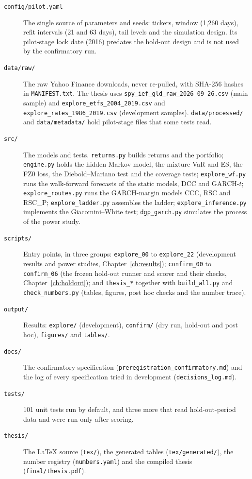 \begin{sloppypar}
\begin{description}
\item[\texttt{config/pilot.yaml}] The single source of parameters and seeds: tickers, window (1,260 days), refit intervals (21 and 63 days), tail levels and the simulation design. Its pilot-stage lock date (2016) predates the hold-out design and is not used by the confirmatory run.
\item[\texttt{data/raw/}] The raw Yahoo Finance downloads, never re-pulled, with SHA-256 hashes in \texttt{MANIFEST.txt}. The thesis uses \texttt{spy\_ief\_gld\_raw\_2026-09-26.csv} (main sample) and \texttt{explore\_etfs\_2004\_2019.csv} and \texttt{explore\_rates\_1986\_2019.csv} (development samples). \texttt{data/processed/} and \texttt{data/metadata/} hold pilot-stage files that some tests read.
\item[\texttt{src/}] The models and tests. \texttt{returns.py} builds returns and the portfolio; \texttt{engine.py} holds the hidden Markov model, the mixture VaR and ES, the FZ0 loss, the Diebold--Mariano test and the coverage tests; \texttt{explore\_wf.py} runs the walk-forward forecasts of the static models, DCC and GARCH-$t$; \texttt{explore\_routes.py} runs the GARCH-margin models CCC, RSC and RSC\_P; \texttt{explore\_ladder.py} assembles the ladder; \texttt{explore\_inference.py} implements the Giacomini--White test; \texttt{dgp\_garch.py} simulates the process of the power study.
\item[\texttt{scripts/}] Entry points, in three groups: \texttt{explore\_00} to \texttt{explore\_22} (development results and power studies, Chapter~\ref{ch:results}); \texttt{confirm\_00} to \texttt{confirm\_06} (the frozen hold-out runner and scorer and their checks, Chapter~\ref{ch:holdout}); and \texttt{thesis\_*} together with \texttt{build\_all.py} and \texttt{check\_numbers.py} (tables, figures, post hoc checks and the number trace).
\item[\texttt{output/}] Results: \texttt{explore/} (development), \texttt{confirm/} (dry run, hold-out and post hoc), \texttt{figures/} and \texttt{tables/}.
\item[\texttt{docs/}] The confirmatory specification (\texttt{preregistration\_confirmatory.md}) and the log of every specification tried in development (\texttt{decisions\_log.md}).
\item[\texttt{tests/}] 101 unit tests run by default, and three more that read hold-out-period data and were run only after scoring.
\item[\texttt{thesis/}] The LaTeX source (\texttt{tex/}), the generated tables (\texttt{tex/generated/}), the number registry (\texttt{numbers.yaml}) and the compiled thesis (\texttt{final/thesis.pdf}).
\end{description}
\end{sloppypar}

